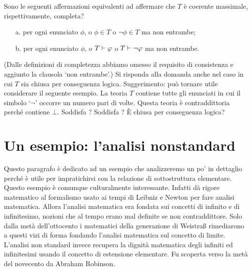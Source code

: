 \begin{exercise}
Sono le seguenti affermazioni equivalenti ad affermare che $T$ \`e coerente massimale, rispettivamente, completa?
\begin{itemize}
\item[a.] per ogni enunciato $\phi$, o $\phi\in T$ o  $\neg\phi\in T$ ma non entrambe;
\item[b.] per ogni enunciato $\phi$, o $T\vdash\varphi$ o  $T\vdash\neg\varphi$ ma non entrambe.
\end{itemize}
(Dalle definizioni di completezza abbiamo omesso il requisito di consistenza e aggiunto la clausola `non entrambe'.)
Si risponda alla domanda anche nel caso in cui $T$ sia chiusa per conseguenza logica. Suggerimento: pu\`o tornare utile considerare il seguente esempio. La teoria $T$ contiene tutte gli enunciati in cui il simbolo `$\neg$' occorre un numero pari di volte. Questa teoria \`e contraddittoria perch\'e contiene $\bot$. Soddisfa ? Soddisfa ? \`E chiusa per conseguenza logica?\QED
\end{exercise}

\section{Un esempio: l'analisi nonstandard}
\label{nonstandard}

Questo paragrafo \`e dedicato ad un esempio che analizzeremo un po' in dettaglio perch\'e \`e utile per impratichirsi con la relazione di sottostruttura elementare. Questo esempio \`e comunque culturalmente interessante. Infatti d\`a rigore matematico al formalismo usato ai tempi di Leibniz e Newton per fare analisi matematica. Allora l'analisi matematica era fondata sui concetti di infinito e di infinitesimo, nozioni che al tempo erano mal definite se non contraddittore. Solo dalla met\`a dell'ottocento i matematici della generazione di Weistra\ss{} rimediarono a questi vizi di forma fondando l'analisi matematica sul concetto di limite. L'analisi non standard invece recupera la dignit\`a matematica degli infiniti ed infinitesimi usando il concetto di estensione elementare. Fu scoperta verso la met\`a del novecento da Abraham Robinson.

